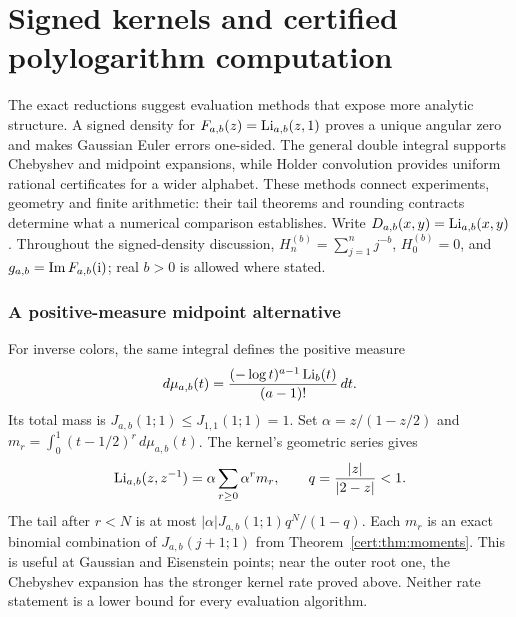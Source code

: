 \chapter{Signed kernels and certified polylogarithm computation}
\label{ch:certified-computation}
The exact reductions suggest evaluation methods that expose more analytic
structure. A signed density for $F_{a,b}(z)=\operatorname{Li}_{a,b}(z,1)$ proves a unique
angular zero and makes Gaussian Euler errors one-sided. The general double
integral supports Chebyshev and midpoint expansions, while Holder convolution
provides uniform rational certificates for a wider alphabet. These methods
connect experiments, geometry and finite arithmetic: their tail theorems and
rounding contracts determine what a numerical comparison establishes.
Write $D_{a,b}(x,y)=\operatorname{Li}_{a,b}(x,y)$. Throughout the signed-density discussion,
$H_n^{(b)}=\sum_{j=1}^n j^{-b}$, $H_0^{(b)}=0$, and
$g_{a,b}=\operatorname{Im} F_{a,b}(\mathrm{i})$; real $b>0$ is allowed where stated.























\subsection{A positive-measure midpoint alternative}
For inverse colors, the same integral defines the positive measure
\[
 d\mu_{a,b}(t)=\frac{(-\log t)^{a-1}\operatorname{Li}_b(t)}{(a-1)!}\,dt.
\]
Its total mass is $J_{a,b}(1;1)\le J_{1,1}(1;1)=1$.
Set $\alpha=z/(1-z/2)$ and
$m_r=\int_0^1(t-1/2)^r\,d\mu_{a,b}(t)$. The kernel's geometric series gives
\[
 \operatorname{Li}_{a,b}(z,z^{-1})=\alpha\sum_{r\ge0}\alpha^r m_r,
 \qquad q=\frac{|z|}{|2-z|}<1.
\]
The tail after $r<N$ is at most
$|\alpha|J_{a,b}(1;1)q^N/(1-q)$. Each $m_r$ is an exact binomial
combination of $J_{a,b}(j+1;1)$ from Theorem~\ref{cert:thm:moments}.
This is useful at Gaussian and Eisenstein points; near the outer root one,
the Chebyshev expansion has the stronger kernel rate proved above.
Neither rate statement is a lower bound for every evaluation algorithm.



